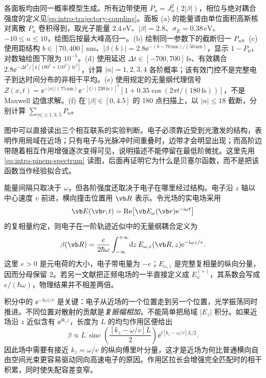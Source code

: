 各面板均由同一概率模型生成。所有边带使用 $P_n=J_n^2(2|\beta|)$，相位与绝对耦合强度的定义见\cref{eq:intro-trajectory-coupling}。面板 (a) 的能量谱由单位面积高斯核对离散 $P_n$ 卷积得到，取光子能量 $2.4\,\mathrm{eV}$、$|\beta|=2.8$、$\sigma_E=0.38\,\mathrm{eV}$、$-10\le n\le10$，绘图后按最大峰高归一。(b) 绘制同一参数下的截断归一 $P_n$。(c) 使用距结构 $b\in[70,400]\,\mathrm{nm}$、$|\beta(b)|=2.8\ee^{-(b-70\,\mathrm{nm})/(50\,\mathrm{nm})}$，显示 $1-P_0$，对数轴绘图下限为 $10^{-5}$。(d) 使用延迟 $\Delta t\in[-700,700]\,\mathrm{fs}$、有效耦合 $2.8\ee^{-\Delta t^2/[4(180^2+110^2)\,\mathrm{fs}^2]}$，计算 $|n|=1,2,3,4$ 各阶概率；该有效门控不是完整电子到达时间分布的非相干平均。(e) 使用规定的无量纲代理信号 $Z(x,t)=\ee^{-|x|/(75\,\mathrm{nm})}\ee^{-[t/(230\,\mathrm{fs})]^2}[1+0.35\cos(2\pi t/(180\,\mathrm{fs}))]$，不是 Maxwell 边值求解。(f) 在 $|\beta|\in[0,4.5]$ 的 180 点扫描上，以 $|n|\le18$ 截断，分别计算 $\sum_{|n|\ge1,3,5}P_n$。


图中可以直接读出三个相互联系的实验判断。电子必须靠近受到光激发的结构，表明作用局域在近场；只有电子与光脉冲时间重叠时，边带才会明显出现；而高阶边带随着相互作用增强逐次变得可见，说明描述不能停留在最低阶微扰。这里先用\cref{eq:intro-pinem-spectrum} 读图，后面再证明它为什么是贝塞尔函数，而不是把该函数当作经验拟合式。


能量间隔只取决于 $\omega$，但各阶强度还取决于电子在哪里经过结构。电子沿 $z$ 轴以中心速度 $v$ 前进，横向撞击位置用 $\vb R$ 表示。令光场的实电场采用
\begin{equation}
\vb E(\vb r,t)=\operatorname{Re}\!\left[\vb E_\omega(\vb r)\ee^{-\ii\omega t}\right]
\label{eq:intro-field-phasor}
\end{equation}
的复相量约定，则电子在一阶轨迹近似中的无量纲耦合定义为
\begin{equation}
\beta(\vb R)=\frac{e}{2\hbar\omega}
\int_{-\infty}^{+\infty}\!\dd z\,
E_{\omega,z}(\vb R,z)\ee^{-\ii\omega z/v}.
\label{eq:intro-trajectory-coupling}
\end{equation}
这里 $e>0$ 是元电荷的大小，电子带电量为 $-e$；$E_{\omega,z}$ 是完整复相量的纵向分量，因而分母保留 $2$。若另一文献把正频电场的一半直接定义成 $E_\omega^{(+)}$，其系数会写成 $e/(\hbar\omega)$，物理结果并不相差两倍。

积分中的 $\ee^{-\ii\omega z/v}$ 是关键：电子从近场的一个位置走到另一个位置，光学振荡同时推进。不同位置对散射的贡献是\emph{复振幅相加}，不能简单把局域 $|E_z|$ 积分。如果近场沿 $z$ 近似含有 $\ee^{\ii k_z z}$，长度为 $L$ 的均匀作用区便给出
\begin{equation}
\beta\propto L\,\operatorname{sinc}\!\left(\frac{[k_z-\omega/v]L}{2}\right)
\ee^{\ii[k_z-\omega/v]L/2}.
\label{eq:intro-phase-matching}
\end{equation}
因此场中需要有接近 $k_z=\omega/v$ 的纵向傅里叶分量，这才是近场为何比普通横向自由空间光束更容易驱动同向高速电子的原因。作用区拉长会增强完全匹配时的相干积累，同时使失配容差变窄。

